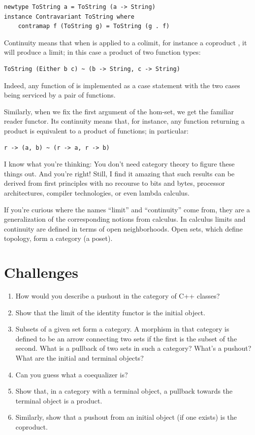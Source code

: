 \begin{Verbatim}
newtype ToString a = ToString (a -> String) 
instance Contravariant ToString where 
    contramap f (ToString g) = ToString (g . f)
\end{Verbatim}

Continuity means that when  is applied to a colimit,
for instance a coproduct , it will produce a limit;
in this case a product of two function types:

\begin{Verbatim}
ToString (Either b c) ~ (b -> String, c -> String)
\end{Verbatim}
Indeed, any function of  is implemented as a case
statement with the two cases being serviced by a pair of functions.

Similarly, when we fix the first argument of the hom-set, we get the
familiar reader functor. Its continuity means that, for instance, any
function returning a product is equivalent to a product of functions; in
particular:

\begin{Verbatim}[commandchars=\\\{\}]
r -> (a, b) ~ (r -> a, r -> b)
\end{Verbatim}
I know what you're thinking: You don't need category theory to figure
these things out. And you're right! Still, I find it amazing that such
results can be derived from first principles with no recourse to bits
and bytes, processor architectures, compiler technologies, or even
lambda calculus.

If you're curious where the names ``limit'' and ``continuity'' come
from, they are a generalization of the corresponding notions from
calculus. In calculus limits and continuity are defined in terms of open
neighborhoods. Open sets, which define topology, form a category (a
poset).

\section{Challenges}\label{challenges}

\begin{enumerate}
\tightlist
\item
  How would you describe a pushout in the category of C++ classes?
\item
  Show that the limit of the identity functor
   is the initial object.
\item
  Subsets of a given set form a category. A morphism in that category is
  defined to be an arrow connecting two sets if the first is the subset
  of the second. What is a pullback of two sets in such a category?
  What's a pushout? What are the initial and terminal objects?
\item
  Can you guess what a coequalizer is?
\item
  Show that, in a category with a terminal object, a pullback towards
  the terminal object is a product.
\item
  Similarly, show that a pushout from an initial object (if one exists)
  is the coproduct.
\end{enumerate}